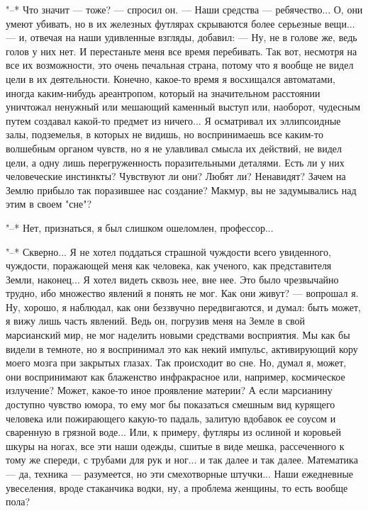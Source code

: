 "--* Что значит --- тоже? --- спросил он. --- Наши средства ---  ребячество...  О,
они умеют убивать, но в их железных футлярах  скрываются  более  серьезные
вещи... --- и, отвечая на наши удивленные  взгляды,  добавил:  ---  Ну,  не  в
голове же, ведь голов у них нет. И перестаньте меня все время  перебивать.
Так вот, несмотря на все  их  возможности,  это  очень  печальная  страна,
потому что я вообще не видел цели в  их  деятельности.  Конечно,  какое-то
время я восхищался автоматами, иногда каким-нибудь ареантропом, который на
значительном расстоянии уничтожал ненужный или  мешающий  каменный  выступ
или, наоборот, чудесным путем создавал какой-то  предмет  из  ничего...  Я
осматривал их эллипсоидные залы,  подземелья,  в  которых  не  видишь,  но
воспринимаешь все каким-то волшебным органом чувств,  но  я  не  улавливал
смысла  их  действий,  не  видел  цели,  а   одну   лишь   перегруженность
поразительными деталями. Есть ли у них человеческие  инстинкты?  Чувствуют
ли они? Любят ли? Ненавидят? Зачем на Землю  прибыло  так  поразившее  нас
создание? Макмур, вы не задумывались над этим в своем "сне"?

"--* Нет, признаться, я был слишком ошеломлен, профессор...

"--* Скверно... Я не хотел поддаться страшной чуждости  всего  увиденного,
чуждости, поражающей меня как человека,  как  ученого,  как  представителя
Земли, наконец... Я хотел видеть сквозь нее, вне нее. Это было чрезвычайно
трудно, ибо множество явлений я понять не мог. Как они живут?  ---  вопрошал
я. Ну, хорошо, я наблюдал, как они беззвучно передвигаются, и думал:  быть
может, я вижу лишь часть явлений. Ведь он, погрузив меня на Земле  в  свой
марсианский мир, не мог наделить новыми средствами восприятия. Мы  как  бы
видели в темноте, но я воспринимал это  как  некий  импульс,  активирующий
кору моего мозга при закрытых глазах. Так происходит во сне. Но, думал  я,
может,  они  воспринимают  как  блаженство  инфракрасное  или,   например,
космическое излучение? Может, какое-то иное  проявление  материи?  А  если
марсианину доступно чувство юмора, то ему мог бы  показаться  смешным  вид
курящего человека или пожирающего какую-то  падаль,  залитую  вдобавок  ее
соусом и сваренную в грязной воде... Или, к примеру, футляры из ослиной  и
коровьей шкуры на ногах,  все  эти  наши  одежды,  сшитые  в  виде  мешка,
рассеченного к тому же спереди, с трубами для рук и ног... и так  далее  и
так далее. Математика --- да, техника  ---  разумеется,  но  эти  смехотворные
штучки... Наши  ежедневные  увеселения,  вроде  стаканчика  водки,  ну,  а
проблема женщины, то есть вообще пола?

